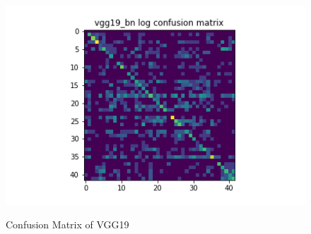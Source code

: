 \begin{figure}[t]
\begin{minipage}[b]{.5\linewidth}
  \end{minipage}
  \hfill
  \begin{minipage}[b]{.5\linewidth}
    \centering
    {\includegraphics[width=1.2\textwidth]{figs/conf_matrix/vgg19_bn_log_conf.png}}
  \end{minipage}

  \caption{Confusion Matrix of VGG19}
  \label{fig:vgg19_conf}
  \vspace{0.2in}
\end{figure}

